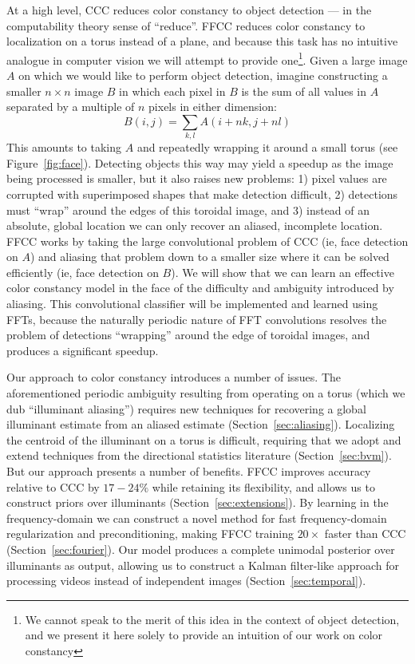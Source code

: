 \documentclass[10pt,twocolumn,letterpaper]{article}
\begin{document}
At a high level, CCC reduces color constancy to object detection ---
in the computability theory sense of ``reduce''.
FFCC reduces color constancy to localization on a torus instead of a plane,
and because this task has no intuitive analogue in computer vision we will
attempt to provide one\footnote{
We cannot speak to the merit of this idea in the context of object detection,
and we present it here solely to provide an intuition of our work on color
constancy}.
Given a large image $A$ on which we would like to perform object detection,
imagine constructing a smaller $n \times n$ image $B$ in which each pixel in $B$
is the sum of all values in $A$ separated by a multiple of $n$ pixels in either
dimension:
\begin{equation}
B(i,j) = \sum_{k, l} A(i + nk, j + nl)
\end{equation}
This amounts to taking $A$ and repeatedly wrapping it around a small torus
(see Figure~\ref{fig:face}).
Detecting objects this way may yield a speedup as the image being
processed is smaller, but it also raises new problems:
1) pixel values are corrupted with superimposed shapes that make detection difficult,
2) detections must ``wrap'' around the edges of this toroidal image,
and 3) instead of an absolute, global location we can only recover an aliased,
incomplete location.
FFCC works by taking the large convolutional problem of CCC
(ie, face detection on $A$)
and aliasing that problem down to a smaller size where it can be solved efficiently
(ie, face detection on $B$).
We will show that we can learn an effective color constancy model in the face of
the difficulty and ambiguity introduced by aliasing.
This convolutional classifier will be implemented and learned using FFTs,
because the naturally periodic nature of FFT convolutions resolves
the problem of detections ``wrapping'' around the edge of toroidal images,
and produces a significant speedup.

Our approach to color constancy introduces a number of issues.
The aforementioned periodic ambiguity resulting from operating
on a torus (which we dub ``illuminant aliasing'') requires new techniques
for recovering a global illuminant estimate from an aliased estimate
(Section~\ref{sec:aliasing}).
Localizing the centroid of the illuminant on a torus is difficult, requiring
that we adopt and extend techniques from the directional statistics literature
(Section~\ref{sec:bvm}).
But our approach presents a number of benefits.
FFCC improves accuracy relative to CCC by $17-24\%$ while retaining its flexibility,
and allows us to construct priors over illuminants (Section~\ref{sec:extensions}).
By learning in the frequency-domain we can
construct a novel method for fast frequency-domain regularization and
preconditioning, making FFCC training $20\times$ faster than CCC
(Section~\ref{sec:fourier}).
Our model produces a complete unimodal posterior over illuminants as output,
allowing us to construct a Kalman filter-like approach for processing videos
instead of independent images
(Section~\ref{sec:temporal}).
\end{document}
